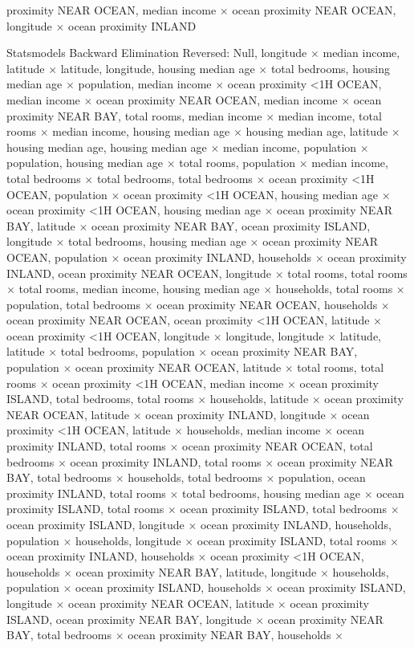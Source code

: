 \documentclass{article}
\begin{document}
proximity NEAR OCEAN, median income $\times$ ocean proximity NEAR OCEAN, longitude $\times$ ocean proximity INLAND

Statsmodels Backward Elimination Reversed: Null, longitude $\times$ median income, latitude $\times$ latitude, longitude, housing median age $\times$ total bedrooms, housing median age $\times$ population, median income $\times$ ocean proximity <1H OCEAN, median income $\times$ ocean proximity NEAR OCEAN, median income $\times$ ocean proximity NEAR BAY, total rooms, median income $\times$ median income, total rooms $\times$ median income, housing median age $\times$ housing median age, latitude $\times$ housing median age, housing median age $\times$ median income, population $\times$ population, housing median age $\times$ total rooms, population $\times$ median income, total bedrooms $\times$ total bedrooms, total bedrooms $\times$ ocean proximity <1H OCEAN, population $\times$ ocean proximity <1H OCEAN, housing median age $\times$ ocean proximity <1H OCEAN, housing median age $\times$ ocean proximity NEAR BAY, latitude $\times$ ocean proximity NEAR BAY, ocean proximity ISLAND, longitude $\times$ total bedrooms, housing median age $\times$ ocean proximity NEAR OCEAN, population $\times$ ocean proximity INLAND, households $\times$ ocean proximity INLAND, ocean proximity NEAR OCEAN, longitude $\times$ total rooms, total rooms $\times$ total rooms, median income, housing median age $\times$ households, total rooms $\times$ population, total bedrooms $\times$ ocean proximity NEAR OCEAN, households $\times$ ocean proximity NEAR OCEAN, ocean proximity <1H OCEAN, latitude $\times$ ocean proximity <1H OCEAN, longitude $\times$ longitude, longitude $\times$ latitude, latitude $\times$ total bedrooms, population $\times$ ocean proximity NEAR BAY, population $\times$ ocean proximity NEAR OCEAN, latitude $\times$ total rooms, total rooms $\times$ ocean proximity <1H OCEAN, median income $\times$ ocean proximity ISLAND, total bedrooms, total rooms $\times$ households, latitude $\times$ ocean proximity NEAR OCEAN, latitude $\times$ ocean proximity INLAND, longitude $\times$ ocean proximity <1H OCEAN, latitude $\times$ households, median income $\times$ ocean proximity INLAND, total rooms $\times$ ocean proximity NEAR OCEAN, total bedrooms $\times$ ocean proximity INLAND, total rooms $\times$ ocean proximity NEAR BAY, total bedrooms $\times$ households, total bedrooms $\times$ population, ocean proximity INLAND, total rooms $\times$ total bedrooms, housing median age $\times$ ocean proximity ISLAND, total rooms $\times$ ocean proximity ISLAND, total bedrooms $\times$ ocean proximity ISLAND, longitude $\times$ ocean proximity INLAND, households, population $\times$ households, longitude $\times$ ocean proximity ISLAND, total rooms $\times$ ocean proximity INLAND, households $\times$ ocean proximity <1H OCEAN, households $\times$ ocean proximity NEAR BAY, latitude, longitude $\times$ households, population $\times$ ocean proximity ISLAND, households $\times$ ocean proximity ISLAND, longitude $\times$ ocean proximity NEAR OCEAN, latitude $\times$ ocean proximity ISLAND, ocean proximity NEAR BAY, longitude $\times$ ocean proximity NEAR BAY, total bedrooms $\times$ ocean proximity NEAR BAY, households $\times$ 
\end{document}
